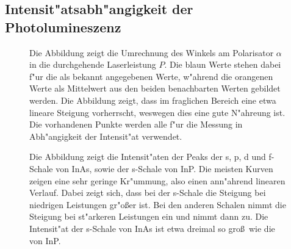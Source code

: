 \subsection{Intensit"atsabh"angigkeit der Photolumineszenz}
\begin{figure}[htbp]
    \centering
    
    \caption{
        Die Abbildung zeigt die Umrechnung des Winkels am Polarisator $\alpha$ in die durchgehende Laserleistung $P$.
        Die blaun Werte stehen dabei f"ur die als bekannt angegebenen Werte, w"ahrend die orangenen Werte als Mittelwert aus den beiden benachbarten Werten gebildet werden.
        Die Abbildung zeigt, dass im fraglichen Bereich eine etwa lineare Steigung vorherrscht, weswegen dies eine gute N"ahreung ist.
        Die vorhandenen Punkte werden alle f"ur die Messung in Abh"angigkeit der Intensit"at verwendet.
    }
    \label{fig:umrechnung}
\end{figure}
\begin{sidewaysfigure}
    
    \caption{
        Spektrum der InAs QDs f"ur verschiedene Laserleistungen $P$.
        Es sind bis zu vier Peaks zu erkennen, die von rechts nach links der s, p, d und f-Schale im atom"ahnlichen Modell entsprechen.
        Die Kreuze bezeichnen die Messpunkte, w"ahrend die durchgezogenen Linien Gau\ss-Fits nach Gleichung \eqref{eq:fit} sind.
        F"ur $P=\SI{0}{\milli\watt}$ sind keine Peaks zu erkennen (da logischerweise keine Emission angeregt wird).
        Die H"ohe der Peaks steigt f"ur steigende Laserleistungen, ihre Position aber ver"andert sich nicht.
    }
    \label{fig:InAs_power}
\end{sidewaysfigure}
\begin{sidewaysfigure}
    
    \caption{
        Spektrum der InP QDs f"ur verschiedene Laserleistungen $P$.
        Der linke Peak entspricht der s-Schale.
        Die Kreuze bezeichnen die Messpunkte, w"ahrend die durchgezogenen Linien Gau\ss-Fits nach Gleichung \eqref{eq:fit} sind.
        Beim Fit wird nur der Bereich bis \SI{780}{\nano\metre} verwendet.
        Die H"ohe der Peaks steigt f"ur steigende Laserleistungen, ihre Position aber ver"andert sich nicht.
    }
    \label{fig:InP_power}
\end{sidewaysfigure}
\begin{figure}[htbp]
    \centering
    
    \caption{
        Die Abbildung zeigt die Intensit"aten der Peaks der s, p, d und f-Schale von InAs, sowie der s-Schale von InP.
        Die meisten Kurven zeigen eine sehr geringe Kr"ummung, also einen ann"ahrend linearen Verlauf.
        Dabei zeigt sich, dass bei der s-Schale die Steigung bei niedrigen Leistungen gr"o\ss er ist.
        Bei den anderen Schalen nimmt die Steigung bei st"arkeren Leistungen ein und nimmt dann zu.
        Die Intensit"at der s-Schale von InAs ist etwa dreimal so gro\ss\ wie die von InP.
    }
    \label{fig:overpower}
\end{figure}

